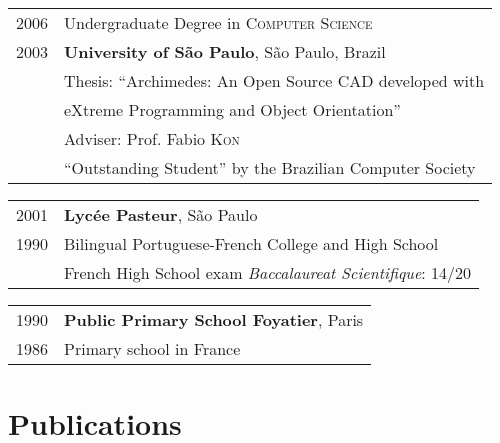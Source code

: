 \documentclass[letter,10pt]{article}
\begin{document}
\begin{tabular}{p{2.5cm}l}
  \textsc{2006} & Undergraduate Degree in \textsc{Computer Science}\\
  \textsc{2003} &\normalsize\textbf{University of São Paulo}, São
  Paulo, Brazil\\
  & Thesis: ``Archimedes: An Open Source CAD developed with\\
  & eXtreme Programming and Object Orientation''\\
  & \small Adviser: Prof. Fabio \textsc{Kon}\\
  & ``Outstanding Student'' by the Brazilian Computer Society\\
\end{tabular}

\begin{tabular}{p{2.5cm}l}
  \textsc{2001} & \textbf{Lycée Pasteur}, São Paulo\\
  \textsc{1990} & Bilingual Portuguese-French College and High School\\
  & French High School exam \textit{Baccalaureat Scientifique}: 14/20
\end{tabular}

\begin{tabular}{p{2.5cm}l}
  \textsc{1990} & \textbf{Public Primary School Foyatier}, Paris\\
  \textsc{1986} & Primary school in France\\
\end{tabular}

\section{Publications}
\end{document}
